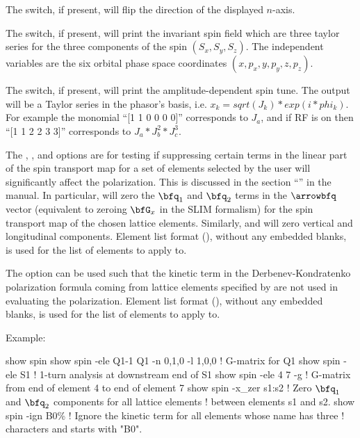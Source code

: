 {{{{{{{{{{The  switch, if present, will flip the direction of the displayed $n$-axis. 

The  switch, if present, will print the invariant spin field which are three taylor series
for the three components of the spin $(S_x, S_y, S_z)$. The independent variables are the six orbital
phase space coordinates $(x, p_x, y, p_y, z, p_z)$.

The  switch, if present, will print the amplitude-dependent spin tune. The output will 
be a Taylor series in the phasor's basis, i.e. $x_k = sqrt(J_k)*exp(i*phi_k)$. For example the 
monomial ``[1 1 0 0 0 0]'' corresponds to $J_a$, and if RF is on then ``[1 1 2 2 3 3]'' corresponds 
to $J_a*J_b^2*J_c^3$.

The , , and  options are for testing if suppressing certain terms
in the linear part of the spin transport map for a set of elements selected by the user will
significantly affect the polarization. This is discussed in the section ``'' in the \bmad manual. In particular,  will zero the $\bfq_1$ and $\bfq_2$
terms in the $\arrowbfq$ vector (equivalent to zeroing $\bfG_x$ in the SLIM formalism) for the spin
transport map of the chosen lattice elements. Similarly,  and  will zero
vertical and longitudinal components. Element list format (), without any
embedded blanks, is used for the  list of elements to apply to.

The  option can be used such that the kinetic term in the Derbenev-Kondratenko
polarization formula coming from lattice elements specified by  are not used in
evaluating the polarization. Element list format (), without any embedded
blanks, is used for the  list of elements to apply to.


Example:
\begin{example}
  show spin
  show spin -ele Q1-1 Q1 -n 0,1,0 -l 1,0,0  ! G-matrix for Q1
  show spin -ele S1      ! 1-turn analysis at downstream end of S1 
  show spin -ele 4 7 -g  ! G-matrix from end of element 4 to end of element 7
  show spin -x_zer s1:s2 ! Zero \(\bfq_1\) and \(\bfq_2\) components for all lattice elements
                         ! between elements s1 and s2.
  show spin -ign B0\%    ! Ignore the kinetic term for all elements whose name has three 
                         !   characters and starts with "B0".
\end{example}

}}}}}}}}}}
